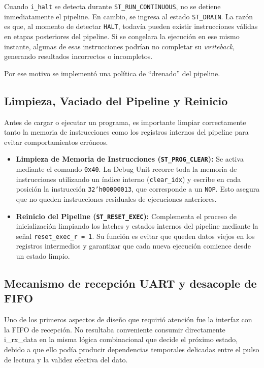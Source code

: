 Cuando \texttt{i\_halt} se detecta durante \texttt{ST\_RUN\_CONTINUOUS}, no se detiene inmediatamente el pipeline. En cambio, se ingresa al estado \texttt{ST\_DRAIN}. La razón es que, al momento de detectar \texttt{HALT}, todavía pueden existir instrucciones válidas en etapas posteriores del pipeline. Si se congelara la ejecución en ese mismo instante, algunas de esas instrucciones podrían no completar su \textit{writeback}, generando resultados incorrectos o incompletos.

Por ese motivo se implementó una política de ``drenado'' del pipeline.

\subsection{Limpieza, Vaciado del Pipeline y Reinicio}
Antes de cargar o ejecutar un programa, es importante limpiar correctamente tanto la memoria de instrucciones como los registros internos del pipeline para evitar comportamientos erróneos.

\begin{itemize}
    \item \textbf{Limpieza de Memoria de Instrucciones (\texttt{ST\_PROG\_CLEAR}):} Se activa mediante el comando \texttt{0x40}. La Debug Unit recorre toda la memoria de instrucciones utilizando un índice interno (\texttt{clear\_idx}) y escribe en cada posición la instrucción \texttt{32'h00000013}, que corresponde a un \texttt{NOP}. Esto asegura que no queden instrucciones residuales de ejecuciones anteriores.
    
    \item \textbf{Reinicio del Pipeline (\texttt{ST\_RESET\_EXEC}):} Complementa el proceso de inicialización limpiando los latches y estados internos del pipeline mediante la señal \texttt{reset\_exec\_r = 1}. Su función es evitar que queden datos viejos en los registros intermedios y garantizar que cada nueva ejecución comience desde un estado limpio.
\end{itemize}

\subsection{Mecanismo de recepción UART y desacople de FIFO}

Uno de los primeros aspectos de diseño que requirió atención fue la interfaz con la FIFO de recepción. No resultaba conveniente consumir directamente i\_rx\_data en la misma lógica combinacional que decide el próximo estado, debido a que ello podía producir dependencias temporales delicadas entre el pulso de lectura y la validez efectiva del dato.

